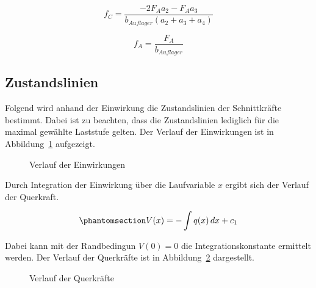 \documentclass[
  12pt,
  letterpaper,
  egregdoesnotlikesansseriftitles]{scrreprt}
\begin{document}
\begin{equation}f_{C} = \frac{- 2 F_{A} a_{2} - F_{A} a_{3}}{b_{Auflager} \left(a_{2} + a_{3} + a_{4}\right)}\end{equation}

\begin{equation}f_{A} = \frac{F_{A}}{b_{Auflager}}\end{equation}

\subsection{Zustandslinien}\label{zustandslinien-1}

Folgend wird anhand der Einwirkung die Zustandslinien der Schnittkräfte
bestimmt. Dabei ist zu beachten, dass die Zustandslinien lediglich für
die maximal gewählte Laststufe gelten. Der Verlauf der Einwirkungen ist
in Abbildung~\ref{fig-q_x_sv14} aufgezeigt.

\begin{figure}[H]


\caption{\label{fig-q_x_sv14}Verlauf der Einwirkungen}

\end{figure}%

Durch Integration der Einwirkung über die Laufvariable \(x\) ergibt sich
der Verlauf der Querkraft.

\begin{equation}\phantomsection\label{eq-vx_integriert_sv14}{
V(x) = -\int q(x) \, dx + c_1
}\end{equation}

Dabei kann mit der Randbedingun \(V(0) = 0\) die Integrationskonstante
ermittelt werden. Der Verlauf der Querkräfte ist in
Abbildung~\ref{fig-v_x_sv14} dargestellt.

\begin{figure}[H]


\caption{\label{fig-v_x_sv14}Verlauf der Querkräfte}

\end{figure}%
\end{document}

